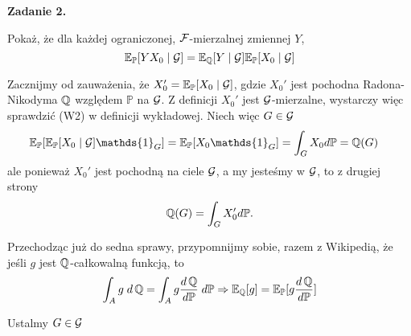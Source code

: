 \documentclass{article}
\newcommand{\E}{\mathbb{E}}
\renewcommand{\P}{\mathbb{P}}
\begin{document}
{\bfseries{\large\color{orange}Zadanie 2.}

  Pokaż, że dla każdej ograniczonej, $\mathcal{F}$-mierzalnej zmiennej $Y$,
  $$\E_\P[YX_0\;|\;\set{G}]=\E_{\Q} [Y\;|\;\set{G}]\E_{\P}[X_0\;|\;\set{G}]$$
}
\medskip

Zacznijmy od zauważenia, że $X_0'=\E_\P[X_0\;|\;\set{G}]$, gdzie $X_0'$ jest pochodna Radona-Nikodyma $\operatorname{\mathbb{Q}}$ względem $\P$ na $\mathcal{G}$. Z definicji $X_0'$ jest $\mathcal{G}$-mierzalne, wystarczy więc sprawdzić (W2) w definicji wykładowej. Niech więc $G\in\mathcal{G}$
\begin{align*}
  \E_{\P}[\E_{\P}[X_0\;|\;\set{G}]\mathds{1}_G]&=\E_{\P}[X_0\mathds{1}_G]=\int_GX_0d\P=\Q(G)
\end{align*}
ale ponieważ $X_0'$ jest pochodną na ciele $\mathcal{G}$, a my jesteśmy w $\mathcal{G}$, to z drugiej strony
$$\Q(G)=\int_GX_0'd\P.$$

Przechodząc już do sedna sprawy, przypomnijmy sobie, razem z Wikipedią, że jeśli $g$ jest $\operatorname{\mathbb{Q}}$-całkowalną funkcją, to
$$\int_Ag\;d\Q=\int_Ag\frac{d\Q}{d\P}\;d\P\implies \E_{\Q}[g]=\E_{\P}[g\frac{d\Q}{d\P}]$$


Ustalmy $G\in\mathcal{G}$

\end{document}
